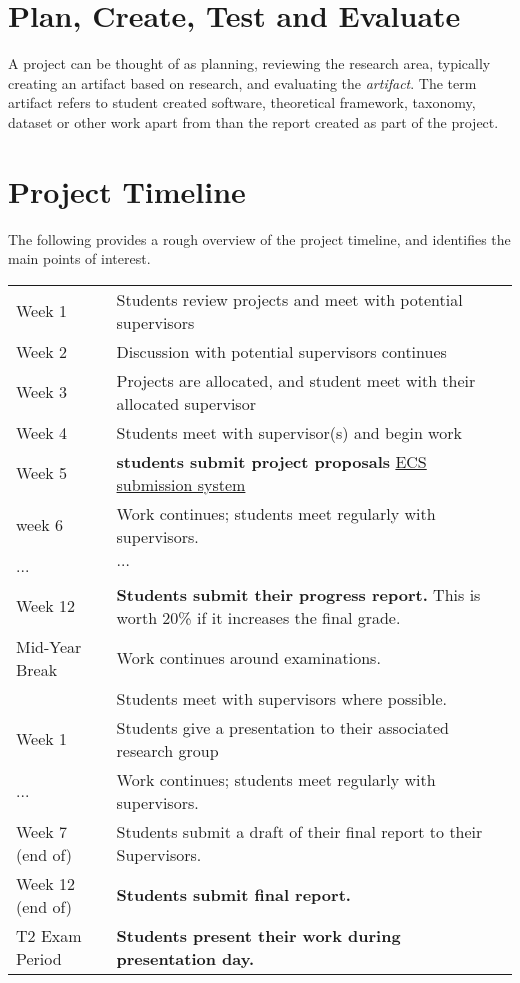 \section{Plan, Create, Test and Evaluate}

A project can be thought of as planning, reviewing the research area, typically creating an artifact based on research,
and evaluating the {\em artifact}.  The term artifact
refers to student created software, theoretical framework, taxonomy, dataset or other work apart from than the report created as part of the project. 

\pagebreak
\section{Project Timeline}
The following provides a rough overview of the project timeline, and identifies the main points of interest.
\begin{center}
\begin{tabular}{|l|p{10cm}|}
\hline
Week 1 & Students review projects and meet with potential supervisors\\
Week 2 & Discussion with potential supervisors continues\\
Week 3 & Projects are allocated, and student meet with their allocated supervisor\\
Week 4 & Students meet with supervisor(s) and begin work\\
Week 5 & \textbf{ students submit project proposals} \href{https://apps.ecs.vuw.ac.nz/submit/COMP489}{ECS submission system}\\
week 6 & Work continues; students meet regularly with supervisors.\\
...&  $\ldots$\\
Week 12 & \textbf{Students submit their progress report.} This is worth 20\% if it increases the final grade.\\
\hline
\hline
Mid-Year Break& Work continues around examinations.\\
&Students meet with supervisors where possible.\\
\hline
\hline
Week 1 & {Students give a presentation to their associated research group}\\
...    & Work continues; students meet regularly with supervisors.\\
Week 7 (end of)& {Students submit a draft of their final report to their Supervisors.}\\
Week 12 (end of)& \textbf{Students submit final report.}\\
\hline
\hline
T2 Exam Period & \textbf{Students present their work during presentation day.}\\
\hline
\end{tabular}
\end{center}
